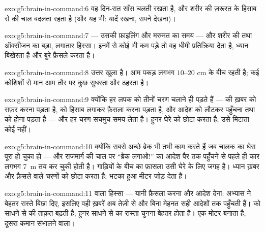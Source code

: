 \begin{solution}{exo:g5:brain-in-command:6}
वह दिन-रात साँस चलती रखता है, और शरीर की ज़रूरत के हिसाब से  की
चाल बदलता रहता है (और यह भी: यादें रखना, सपने देखना)।
\end{solution}

\begin{solution}{exo:g5:brain-in-command:7}
 --- उसकी फ़ाइलिंग और मरम्मत का समय --- और शरीर की  तथा
ऑक्सीजन का बड़ा, लगातार हिस्सा। इनमें से कोई भी कम पड़े तो वह धीमी
प्रतिक्रिया देता है, ध्यान बिखेरता है और बुरे फ़ैसले करता है।
\end{solution}

\begin{solution}{exo:g5:brain-in-command:8}
उत्तर खुला है। आम पकड़ लगभग $10$--$20$ cm के बीच रहती है; कई कोशिशों
से मान आम तौर पर कुछ सुधरता और ठहरता है।
\end{solution}

\begin{solution}{exo:g5:brain-in-command:9}
क्योंकि हर लपक को तीनों चरण चलाने ही पड़ते हैं ---  की ख़बर को
सफ़र करना पड़ता है,  को हिसाब लगाकर फ़ैसला करना पड़ता है, और
आदेश को लौटकर पहुँचना तथा  को  होना पड़ता है --- और हर
चरण सचमुच समय लेता है। हुनर घेरे को छोटा करता है; उसे मिटाता कोई नहीं।
\end{solution}

\begin{solution}{exo:g5:brain-in-command:10}
क्योंकि सबसे अच्छे ब्रेक भी तभी काम करते हैं जब चालक का घेरा पूरा हो
चुका हो --- और राजमार्ग की चाल पर ``ब्रेक लगाओ!'' का आदेश पैर तक
पहुँचने से पहले ही कार लगभग \qty{7}{m} तय कर चुकी होती है। गाड़ियों के
बीच का फ़ासला उसी घेरे के लिए जगह है। ध्यान ख़बर और फ़ैसले वाले चरणों को
छोटा करता है; भटका हुआ  मीटर जोड़ देता है।
\end{solution}

\begin{solution}{exo:g5:brain-in-command:11}
 वाला हिस्सा --- यानी फ़ैसला करना और आदेश देना: अभ्यास ने बेहतर
रास्ते बिछा दिए, इसलिए वही ख़बरें अब तेज़ी से और बिना मेहनत सही आदेशों
तक पहुँचती हैं।  को साधने से  की ताक़त बढ़ती है; हुनर साधने से
 का रास्ता चुनना बेहतर होता है। एक मोटर बनाता है, दूसरा कमान
संभालने वाला।
\end{solution}
